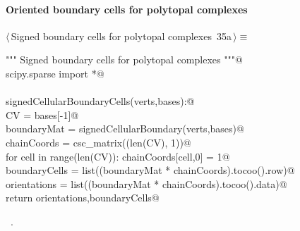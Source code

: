 \documentclass[11pt,oneside]{article}    %
\begin{document}

\paragraph{Oriented boundary cells for polytopal complexes}

\begin{flushleft} \small \label{scrap55}
\protect{}$\langle\,$Signed boundary cells for polytopal complexes\nobreak\ {\footnotesize 35a}$\,\rangle\equiv$
\vspace{-1ex}
\begin{list}{}{} \item
\mbox{}\verb@""" Signed boundary cells for polytopal complexes """@\\
\mbox{}\verb@from scipy.sparse import *@\\
\mbox{}\verb@@\\
\mbox{}\verb@def signedCellularBoundaryCells(verts,bases):@\\
\mbox{}\verb@    CV = bases[-1]@\\
\mbox{}\verb@    boundaryMat = signedCellularBoundary(verts,bases)@\\
\mbox{}\verb@    chainCoords = csc_matrix((len(CV), 1))@\\
\mbox{}\verb@    for cell in range(len(CV)): chainCoords[cell,0] = 1@\\
\mbox{}\verb@    boundaryCells = list((boundaryMat * chainCoords).tocoo().row)@\\
\mbox{}\verb@    orientations = list((boundaryMat * chainCoords).tocoo().data)@\\
\mbox{}\verb@    return orientations,boundaryCells@\\
\mbox{}\verb@@{\NWsep}
\end{list}
\vspace{-1ex}
\footnotesize\addtolength{\baselineskip}{-1ex}
\begin{list}{}{\setlength{\itemsep}{-\parsep}\setlength{\itemindent}{-\leftmargin}}
\item \NWtxtMacroRefIn\ .
\end{list}
\end{flushleft}
\end{document}
